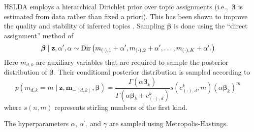 %
%
%

HSLDA employs a hierarchical Dirichlet prior over topic assignments (i.e.,~$\boldsymbol\beta$ is estimated from data rather than fixed a priori).  This has been shown to improve the quality and stability of inferred topics \citep{WallachMiMc2009}. 
%
Sampling $\boldsymbol\beta$ is done using the ``direct assignment''
method of \citet{TehJorBea2006} \begin{equation}
\boldsymbol\beta\mid\mathbf{z},\alpha^{\prime},\alpha\sim{\rm Dir}\left(m_{\left(\cdot\right),1}+\alpha^{\prime},m_{\left(\cdot\right),2}+\alpha^{\prime},\ldots,m_{\left(\cdot\right),K}+\alpha^{\prime}.\right)\end{equation}
Here $m_{d,k}$ are auxiliary variables that are required to sample the posterior distribution of $\boldsymbol\beta$.  Their conditional posterior distribution is sampled according to
 \begin{equation}
p\left(m_{d,k}=m\mid\mathbf{z},\mathbf{m}_{-\left(d,k\right)},\boldsymbol\beta\right)=\frac{\Gamma\left(\alpha\boldsymbol\beta_{k}\right)}{\Gamma\left(\alpha\boldsymbol\beta_{k}+c^k_{(\cdot),d}\right)}s\left(c^k_{(\cdot),d},m\right)\left(\alpha\boldsymbol\beta_{k}\right)^{m}\end{equation}
where $s\left(n,m\right)$ represents stirling numbers of the first
kind.



The hyperparameters $\alpha$, $\alpha^{\prime}$, and $\gamma$ are
sampled
using Metropolis-Hastings. 

